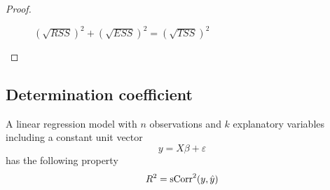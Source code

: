 \begin{proof}
\begin{figure}[h!]
\caption{$(\sqrt{RSS})^2 + (\sqrt{ESS})^2 = (\sqrt{TSS})^2$}
\label{fig:tss_final}
\end{figure}

\end{proof}

\subsection{Determination coefficient}


\begin{theorem}
A linear regression model with $n$ observations and $k$ explanatory variables including a constant unit vector
\[
y = X \beta + \varepsilon
\]
has the following property
\[
R^2 = \operatorname{sCorr}^2(y, \hat y)
\]
\end{theorem}

